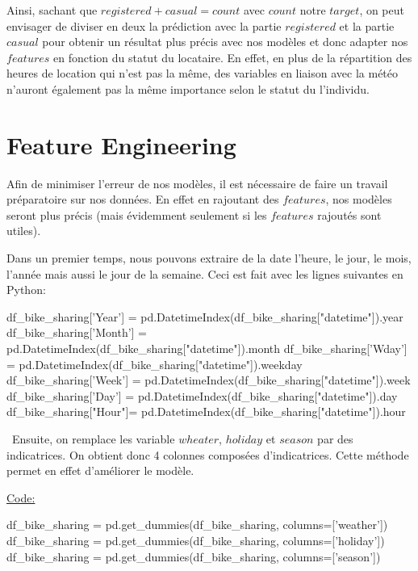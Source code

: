 \documentclass[a4paper,oneside,11pt]{article}
\begin{document}
Ainsi, sachant que $registered+casual=count$ avec $count$ notre $target$, on peut envisager de diviser en deux la prédiction avec la partie $registered$ et la partie $casual$ pour obtenir un résultat plus précis avec nos modèles et donc adapter nos $features$ en fonction du statut du locataire. En effet, en plus de la répartition des heures de location qui n'est pas la même, des variables en liaison avec la météo n'auront également pas la même importance selon le statut du l'individu.

\section*{Feature Engineering}
%



\qquad Afin de minimiser l'erreur de nos modèles, il est nécessaire de faire un travail préparatoire sur nos données. En effet en rajoutant des $features$, nos modèles seront plus précis (mais évidemment seulement si les $features$ rajoutés sont utiles).

Dans un premier temps, nous pouvons extraire de la date l'heure, le jour, le mois, l'année mais aussi le jour de la semaine.
Ceci est fait avec les lignes suivantes en Python:


\begin{code-Python}
df_bike_sharing['Year'] = pd.DatetimeIndex(df_bike_sharing["datetime"]).year
df_bike_sharing['Month'] = pd.DatetimeIndex(df_bike_sharing["datetime"]).month
df_bike_sharing['Wday'] = pd.DatetimeIndex(df_bike_sharing["datetime"]).weekday
df_bike_sharing['Week'] = pd.DatetimeIndex(df_bike_sharing["datetime"]).week
df_bike_sharing['Day'] = pd.DatetimeIndex(df_bike_sharing["datetime"]).day
df_bike_sharing["Hour"]= pd.DatetimeIndex(df_bike_sharing["datetime"]).hour
\end{code-Python}

\ Ensuite, on remplace les variable $wheater$, $holiday$ et $season$  par des indicatrices. On obtient donc 4 colonnes composées d'indicatrices. Cette méthode permet en effet d'améliorer le modèle.

\underline{Code:}
\begin{code-Python}
df_bike_sharing = pd.get_dummies(df_bike_sharing, columns=['weather'])
df_bike_sharing = pd.get_dummies(df_bike_sharing, columns=['holiday'])
df_bike_sharing = pd.get_dummies(df_bike_sharing, columns=['season'])
\end{code-Python}
\end{document}
